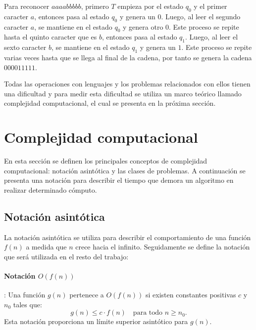 \documentclass[12pt]{article}
\begin{document}
Para reconocer $aaaabbbbb$, primero $T$ empieza por el estado $q_0$ y el primer caracter $a$, entonces pasa al estado $q_0$ y genera un $0$.
Luego, al leer el segundo caracter $a$, se mantiene en el estado $q_0$ y genera otro $0$. Este proceso se repite hasta el quinto caracter
que es $b$, entonces pasa al estado $q_1$. Luego, al leer el sexto caracter $b$, se mantiene en el estado $q_1$ y genera un $1$. Este proceso
se repite varias veces hasta que se llega al final de la cadena, por tanto se genera la cadena $000011111$.



Todas las operaciones con lenguajes y los problemas relacionados con ellos tienen una dificultad y para medir esta dificultad
se utiliza un marco teórico llamado complejidad computacional, el cual se presenta en la próxima sección.

\section{Complejidad computacional}

En esta sección se definen los principales conceptos de complejidad computacional: notación asintótica y las clases de problemas. A continuación se presenta una notación para describir el tiempo que demora un algoritmo en realizar determinado cómputo.

\subsection{Notación asintótica}

La notación asintótica se utiliza para describir el comportamiento de una función $f(n)$ a medida que $n$ crece hacia el infinito.  Seguidamente se define la notación que será utilizada en el resto del trabajo:

\paragraph{Notación $O(f(n))$}: Una función $g(n)$ pertenece a $O(f(n))$ si existen constantes positivas $c$ y $n_0$ tales que:
\[
  g(n) \leq c \cdot f(n) \quad \text{para todo } n \geq n_0.
\]
Esta notación proporciona un límite superior asintótico para $g(n)$.
\end{document}
